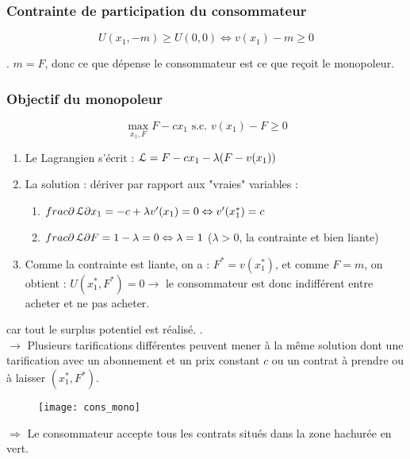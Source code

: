 \subsubsection{Contrainte de participation du consommateur}

\begin{equation*}
U(x_1, -m) \geq U(0,0) \Leftrightarrow v(x_1) - m \geq 0
\end{equation*}

. $m = F$, donc ce que dépense le consommateur est ce que reçoit le monopoleur.

\subsubsection{Objectif du monopoleur}

\begin{equation*}
\max_{x_1, F} F - c x_1 \text{ s.c. } v(x_1) - F \geq 0
\end{equation*}

\begin{enumerate}
\item Le Lagrangien s'écrit : $\operatorname{\mathcal{L}} = F - c x_1 - \lambda (F - v(x_1))$
\item La solution : dériver par rapport aux "vraies" variables :
	\begin{enumerate}
	\item[] $frac{\partial \operatorname{\mathcal{L}}}{\partial x_1} = - c + \lambda v'(x_1) = 0 \Leftrightarrow v'(x^*_1) = c$
	\item[] $frac{\partial \operatorname{\mathcal{L}}}{\partial F} = 1 - \lambda = 0 \Leftrightarrow \lambda = 1$ ($\lambda > 0$, la contrainte et bien liante)
	\end{enumerate}
\item Comme la contrainte est liante, on a : $F^* = v(x^*_1)$, et comme $F = m$, on obtient : $U(x^*_1, F^*) = 0 \rightarrow$ le consommateur est donc indifférent entre acheter et ne pas acheter.
\end{enumerate}

 car tout le surplus potentiel est réalisé. .\\
$\rightarrow$ Plusieurs tarifications différentes peuvent mener à la même solution dont une tarification avec un abonnement et un prix constant $c$ ou un contrat à prendre ou à laisser $(x^*_1, F^*)$.
\begin{figure}[H]
	\centering
	\texttt{[image: cons\_mono]}
\end{figure}
$\Rightarrow$ Le consommateur accepte tous les contrats situés dans la zone hachurée en vert.

